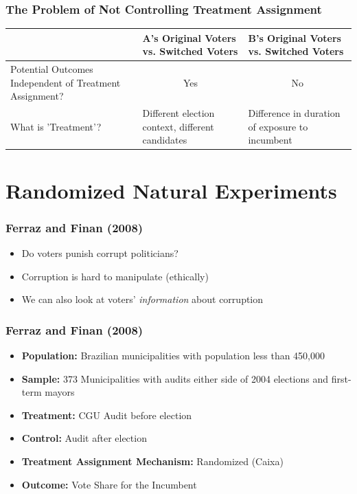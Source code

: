 \documentclass[xcolor=x11names,compress]{beamer}\usepackage[]{graphicx}\usepackage[]{color}
\renewcommand{\(}{\begin{columns}}
\renewcommand{\)}{\end{columns}}
\newcommand{\<}[1]{\begin{column}{#1}}
\renewcommand{\>}{\end{column}}
\begin{document}
\begin{frame}
\frametitle{The Problem of Not Controlling Treatment Assignment}
\footnotesize
\begin{table}[htbp]
  \centering
    \begin{tabular}{|p{3.2cm}|p{2.6cm}|p{2.6cm}|}
    \hline
          & \textbf{A's Original Voters vs. Switched Voters} & \textbf{B's Original Voters vs. Switched Voters} \bigstrut\\
    \hline
    Potential Outcomes Independent of Treatment Assignment? & \multicolumn{1}{c|}{\cellcolor[rgb]{ .776,  .878,  .706} Yes} & \multicolumn{1}{c|}{No} \bigstrut\\
    \hline
    What is 'Treatment'? & Different election context, different candidates & \cellcolor[rgb]{ .776,  .878,  .706} Difference in duration of exposure to incumbent \bigstrut\\
    \hline
    \end{tabular}%
  \label{tab:addlabel}%
\end{table}%
\normalsize
\end{frame}


\section{Randomized Natural Experiments}

\begin{frame}
\frametitle{Ferraz and Finan (2008)}
\begin{itemize}
\item Do voters punish corrupt politicians?
\pause
\item Corruption is hard to manipulate (ethically)
\pause
\item We can also look at voters' \textit{information} about corruption 
\end{itemize}
\end{frame}

\begin{frame}
\frametitle{Ferraz and Finan (2008)}
\begin{itemize}
\item \textbf{Population:} Brazilian municipalities with population less than 450,000
\item \textbf{Sample:} 373 Municipalities with audits either side of 2004 elections and first-term mayors
\item \textbf{Treatment:} CGU Audit before election
\item \textbf{Control:} Audit after election
\item \textbf{Treatment Assignment Mechanism:} Randomized (Caixa)
\item \textbf{Outcome:} Vote Share for the Incumbent
\end{itemize}
\end{frame}
\end{document}
